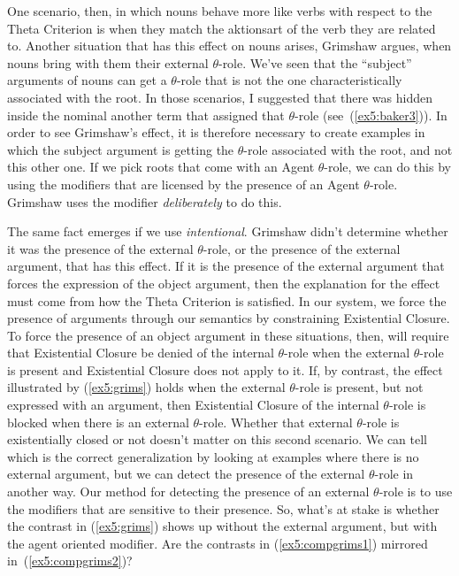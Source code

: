 One scenario, then, in which nouns behave more like verbs with respect to the Theta Criterion is when they match the aktionsart of the verb they are related to. Another situation that has this effect on nouns arises, Grimshaw argues, when nouns bring with them their external $\theta$-role. We've seen that the ``subject'' arguments of nouns can get a $\theta$-role that is not the one characteristically associated with the root. In those scenarios, I suggested that there was hidden inside the nominal another term that assigned that $\theta$-role (see~(\ref{ex5:baker3})). In order to see Grimshaw's effect, it is therefore necessary to create examples in which the subject argument is getting the $\theta$-role associated with the root, and not this other one. If we pick roots that come with an Agent $\theta$-role, we can do this by using the modifiers that are licensed by the presence of an Agent $\theta$-role. Grimshaw uses the modifier \emph{deliberately} to do this.
\begin{exe}
	\raggedright
	\ex \label{ex5:grims} 
	\begin{xlist}
	\end{xlist}
	\hspace*{\fill} \citep[(11):~51]{Grimshaw:1990b} \hspace*{.5in}
\end{exe}
The same fact emerges if we use \emph{intentional}. Grimshaw didn't determine whether it was the presence of the external $\theta$-role, or the presence of the external argument, that has this effect. If it is the presence of the external argument that forces the expression of the object argument, then the explanation for the effect must come from how the Theta Criterion is satisfied. In our system, we force the presence of arguments through our semantics by constraining Existential Closure. To force the presence of an object argument in these situations, then, will require that Existential Closure be denied of the internal $\theta$-role when the external $\theta$-role is present and Existential Closure does not apply to it. If, by contrast, the effect illustrated by (\ref{ex5:grims}) holds when the external $\theta$-role is present, but not expressed with an argument, then Existential Closure of the internal $\theta$-role is blocked when there is an external $\theta$-role. Whether that external $\theta$-role is existentially closed or not doesn't matter on this second scenario. We can tell which is the correct generalization by looking at examples where there is no external argument, but we can detect the presence of the external $\theta$-role in another way. Our method for detecting the presence of an external $\theta$-role is to use the modifiers that are sensitive to their presence. So, what's at stake is whether the contrast in (\ref{ex5:grims}) shows up without the external argument, but with the agent oriented modifier. Are the contrasts in (\ref{ex5:compgrims1}) mirrored in~(\ref{ex5:compgrims2})?

